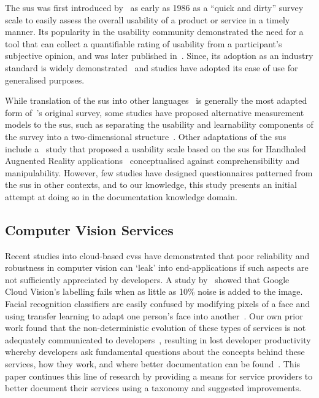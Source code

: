 The \gls{sus} was first introduced by~\citeauthor{Brooke:1996ua} as early as 1986 as a ``quick and dirty'' survey scale to easily assess the overall usability of a product or service in a timely manner. Its popularity in the usability community demonstrated the need for a tool that can collect a quantifiable rating of usability from a participant's subjective opinion, and was later published in~\citep{Brooke:1996ua}. Since, its adoption as an industry standard is widely demonstrated~\citep{Brooke:2013vt,Bangor2008} and studies have adopted its ease of use for generalised purposes.

While translation of the \gls{sus} into other languages~\citep{Martins2015,Sauro:2011aj,Borsci2009} is generally the most adapted form of~\citeauthor{Brooke:2013vt}'s original survey, some studies have proposed alternative measurement models to the \gls{sus}, such as separating the usability and learnability components of the survey into a two-dimensional structure~\citep{Borsci2009}. Other adaptations of the \gls{sus} include a~\citeyear{Santos2014} study that proposed a usability scale based on the \gls{sus} for Handhaled Augnented Reality applications~\citep{Santos2014} conceptualised against comprehensibility and manipulability. However, few studies have designed questionnaires patterned from the \gls{sus} in other contexts, and to our knowledge, this study presents an initial attempt at doing so in the  documentation knowledge domain.

\subsection{Computer Vision Services}

Recent studies into cloud-based \glspl{cvs} have demonstrated that poor reliability and robustness in computer vision can `leak' into end-applications if such aspects are not sufficiently appreciated by developers. A study by~\citet{Hosseini:2018jr} showed that Google Cloud Vision's labelling fails when as little as 10\% noise is added to the image. Facial recognition classifiers are easily confused by modifying pixels of a face and using transfer learning to adapt one person's face into another~\citep{Wang:2018vl}. Our own prior work found that the non-deterministic evolution of these types of services is not adequately communicated to developers~\citep{Cummaudo:2019icsme}, resulting in lost developer productivity whereby developers ask fundamental questions about the concepts behind these services, how they work, and where better documentation can be found~\citep{Cummaudo:2020icse}. This paper continues this line of research by providing a means for service providers to better document their services using a taxonomy and suggested improvements.

